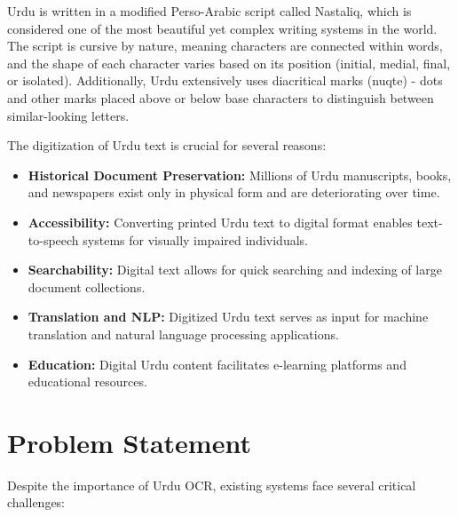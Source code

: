 \documentclass[12pt,a4paper,oneside]{report}
\begin{document}
Urdu is written in a modified Perso-Arabic script called Nastaliq, which is considered one of the most beautiful yet complex writing systems in the world. The script is cursive by nature, meaning characters are connected within words, and the shape of each character varies based on its position (initial, medial, final, or isolated). Additionally, Urdu extensively uses diacritical marks (nuqte) - dots and other marks placed above or below base characters to distinguish between similar-looking letters.

The digitization of Urdu text is crucial for several reasons:
\begin{itemize}
    \item \textbf{Historical Document Preservation:} Millions of Urdu manuscripts, books, and newspapers exist only in physical form and are deteriorating over time.
    \item \textbf{Accessibility:} Converting printed Urdu text to digital format enables text-to-speech systems for visually impaired individuals.
    \item \textbf{Searchability:} Digital text allows for quick searching and indexing of large document collections.
    \item \textbf{Translation and NLP:} Digitized Urdu text serves as input for machine translation and natural language processing applications.
    \item \textbf{Education:} Digital Urdu content facilitates e-learning platforms and educational resources.
\end{itemize}

\section{Problem Statement}

Despite the importance of Urdu OCR, existing systems face several critical challenges:
\end{document}
